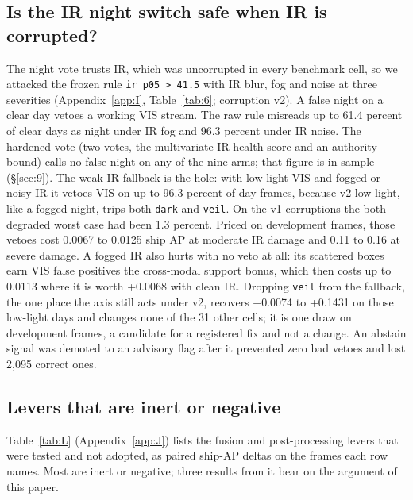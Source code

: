 \documentclass[10pt]{article}
\begin{document}
\subsection{Is the IR night switch safe when IR is corrupted?}\label{sec:6.7}
The night vote trusts IR, which was uncorrupted in every benchmark cell, so we attacked the frozen rule \texttt{ir\_\allowbreak{}p05 > 41.5} with IR blur, fog and noise at three severities (Appendix~\ref{app:I}, Table~\ref{tab:6}; corruption v2). A false night on a clear day vetoes a working VIS stream. The raw rule misreads up to 61.4 percent of clear days as night under IR fog and 96.3 percent under IR noise. The hardened vote (two votes, the multivariate IR health score and an authority bound) calls no false night on any of the nine arms; that figure is in-sample (\S\ref{sec:9}). The weak-IR fallback is the hole: with low-light VIS and fogged or noisy IR it vetoes VIS on up to 96.3 percent of day frames, because v2 low light, like a fogged night, trips both \texttt{dark} and \texttt{veil}. On the v1 corruptions the both-degraded worst case had been 1.3 percent. Priced on development frames, those vetoes cost 0.0067 to 0.0125 ship AP at moderate IR damage and 0.11 to 0.16 at severe damage. A fogged IR also hurts with no veto at all: its scattered boxes earn VIS false positives the cross-modal support bonus, which then costs up to 0.0113 where it is worth +0.0068 with clean IR. Dropping \texttt{veil} from the fallback, the one place the axis still acts under v2, recovers +0.0074 to +0.1431 on those low-light days and changes none of the 31 other cells; it is one draw on development frames, a candidate for a registered fix and not a change. An abstain signal was demoted to an advisory flag after it prevented zero bad vetoes and lost 2,095 correct ones.

\subsection{Levers that are inert or negative}\label{sec:6.8}
Table~\ref{tab:L} (Appendix~\ref{app:J}) lists the fusion and post-processing levers that were tested and not adopted, as paired ship-AP deltas on the frames each row names. Most are inert or negative; three results from it bear on the argument of this paper.
\end{document}
